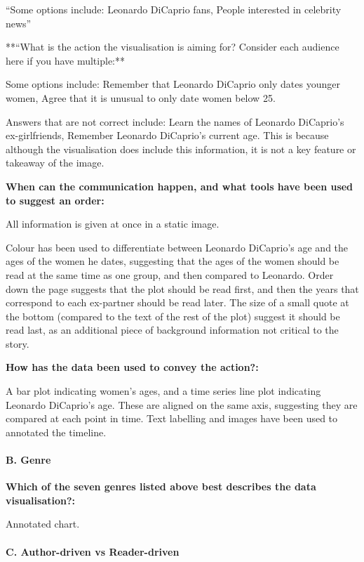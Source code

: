 \documentclass[]{article}
\let\oldparagraph\paragraph
\renewcommand{\paragraph}[1]{\oldparagraph{#1}\mbox{}}
\begin{document}
 ``Some options include: Leonardo DiCaprio fans, People interested in
celebrity news''

**``What is the action the visualisation is aiming for? Consider each
audience here if you have multiple:**

 Some options include: Remember that Leonardo DiCaprio only dates
younger women, Agree that it is unusual to only date women below 25.

 Answers that are not correct include: Learn the names of Leonardo
DiCaprio's ex-girlfriends, Remember Leonardo DiCaprio's current age.
This is because although the visualisation does include this
information, it is not a key feature or takeaway of the image.

\textbf{When can the communication happen, and what tools have been used
to suggest an order:}

 All information is given at once in a static image.

 Colour has been used to differentiate between Leonardo DiCaprio's age
and the ages of the women he dates, suggesting that the ages of the
women should be read at the same time as one group, and then compared to
Leonardo. Order down the page suggests that the plot should be read
first, and then the years that correspond to each ex-partner should be
read later. The size of a small quote at the bottom (compared to the
text of the rest of the plot) suggest it should be read last, as an
additional piece of background information not critical to the story.

\textbf{How has the data been used to convey the action?:}

 A bar plot indicating women's ages, and a time series line plot
indicating Leonardo DiCaprio's age. These are aligned on the same axis,
suggesting they are compared at each point in time. Text labelling and
images have been used to annotated the timeline.

\paragraph{B. Genre}\label{b.-genre-1}

\textbf{Which of the seven genres listed above best describes the data
visualisation?:}

 Annotated chart.

\paragraph{C. Author-driven vs
Reader-driven}\label{c.-author-driven-vs-reader-driven-1}
\end{document}
